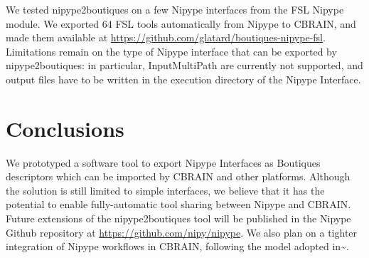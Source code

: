 \documentclass[twocolumn]{bmcart}%
\begin{document}
We tested nipype2boutiques on a few Nipype interfaces from the FSL
Nipype module. We exported 64 FSL tools automatically from Nipype to
CBRAIN, and made them available at
\url{https://github.com/glatard/boutiques-nipype-fsl}. Limitations
remain on the type of Nipype interface that can be exported by
nipype2boutiques: in particular, InputMultiPath are currently not
supported, and output files have to be written in the execution
directory of the Nipype Interface.

\section{Conclusions}\label{conclusions}

We prototyped a software tool to export Nipype Interfaces as Boutiques
descriptors which can be imported by CBRAIN and other platforms.
Although the solution is still limited to simple interfaces, we believe
that it has the potential to enable fully-automatic tool sharing between
Nipype and CBRAIN. Future extensions of the nipype2boutiques tool will
be published in the Nipype Github repository at
\url{https://github.com/nipy/nipype}. We also plan on a tighter
integration of Nipype workflows in CBRAIN, following the model adopted
in\textasciitilde{}\cite{GLAT-16}.

\end{document}
